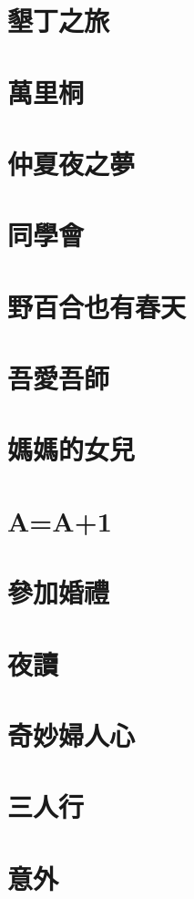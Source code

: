 \chapter{墾丁之旅}
\chapter{萬里桐}
\chapter{仲夏夜之夢}
\chapter{同學會}
\chapter{野百合也有春天}
\chapter{吾愛吾師}
\chapter{媽媽的女兒}
\chapter{A=A+1}
\chapter{參加婚禮}
\chapter{夜讀}
\chapter{奇妙婦人心}
\chapter{三人行}
\chapter{意外}
